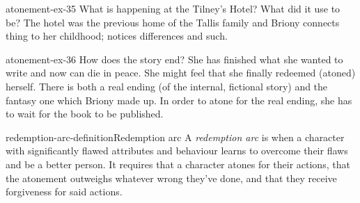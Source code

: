 \documentclass[preview]{standalone}
\begin{document}
\begin{snippetexercise}{atonement-ex-35}
    {What is happening at the Tilney's Hotel? What did it use to be?}
    The hotel was the previous home of the Tallis family
    and Briony connects thing to her childhood; notices differences and such.
\end{snippetexercise}

\begin{snippetexercise}{atonement-ex-36}
    {How does the story end?}
    She has finished what she wanted to write and now can die in peace.
    She might feel that she finally redeemed (atoned) herself.
    There is both a real ending (of the internal, fictional story)
    and the fantasy one which Briony made up.
    In order to atone for the real ending, she has to wait for the book to be published.
\end{snippetexercise}

\begin{snippetdefinition}{redemption-arc-definition}{Redemption arc}
    A \textit{redemption arc} is when a character with significantly flawed attributes and behaviour learns to overcome their flaws and be a better person.
    It requires that a character atones for their actions, that the atonement outweighs whatever wrong they've done, and that they receive forgiveness for said actions.
\end{snippetdefinition}
\end{document}
